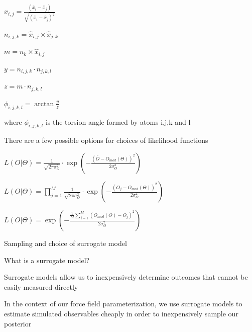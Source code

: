 \documentclass{report}
\begin{document}
\begin{outline}
\begin{outline}
\begin{outline}
\begin{outline}
\begin{outline}
          \begin{outline}
            \item{$\hat{x}_{i,j} = \frac{\left(\bar{x}_i - \bar{x}_j\right)}{\sqrt{\left(\bar{x}_i - \bar{x}_j\right)^2}}$}
            \item{$n_{i,j,k} = \hat{x}_{i,j} \times \hat{x}_{j,k}$}
            \item{$m = n_k \times \hat{x}_{i,j}$}
            \item{$y = n_{i,j,k} \cdot n_{j,k,l}$}
            \item{$z = m \cdot n_{j,k,l}$}
            \item{$\phi_{i,j,k,l} = \arctan \frac{y}{z}$}
            \item{where $\phi_{i,j,k,l}$ is the torsion angle formed by atoms i,j,k and l}
          \end{outline}
        \end{outline}
        \item{There are a few possible options for choices of likelihood functions}
        \begin{outline}
          \item{$L\left(O|\Theta\right) = \frac{1}{\sqrt{2\pi\sigma_O^2}} \cdot \exp\left(-\frac{\left(\bar{O} - O_{mod}\left(\Theta\right)\right)^2}{2
                   \sigma_O^2}\right)$}
          \item{$L\left(O|\Theta\right) = \prod_{j=1}^M \frac{1}{\sqrt{2\pi\sigma_O^2}} \cdot \exp\left(-\frac{\left(O_j - O_{mod}\left(\Theta\right)
                  \right)^2}{2\sigma_O^2}\right)$}
          \item{$L\left(O|\Theta\right) = \exp\left(-\frac{\frac{1}{M} \sum_{j=1}^M \left(O_{mod}\left(\Theta\right) - O_j\right)^2}{2\sigma_O^2}\right)$}
        \end{outline}
      \end{outline}
      \item{Sampling and choice of surrogate model}
      \begin{outline}
        \item{What is a surrogate model?}
        \begin{outline}
          \item{Surrogate models allow us to inexpensively determine outcomes that cannot be easily measured directly}
          \item{In the context of our force field parameterization, we use surrogate models to estimate simulated observables cheaply in order to 
		  inexpensively sample our posterior}

\end{outline}
\end{outline}
\end{outline}
\end{outline}
\end{outline}
\end{document}
